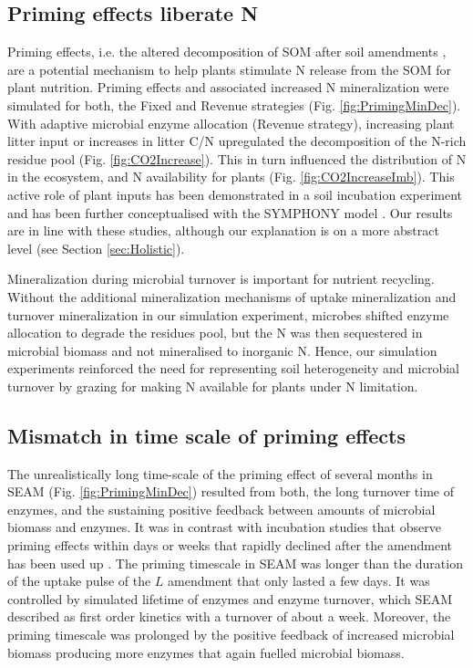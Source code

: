 \subsection{Priming effects liberate N}
Priming effects, i.e. the altered decomposition of SOM after soil amendments
\citep{Kuzyakov00}, are a potential mechanism to help plants stimulate N release
from the SOM for plant nutrition.
Priming effects and associated increased N mineralization were simulated for
both, the Fixed and Revenue strategies (Fig. \ref{fig:PrimingMinDec}). With
adaptive microbial enzyme allocation (Revenue strategy), increasing
plant litter input or increases in litter C/N upregulated
the decomposition of the N-rich residue pool (Fig.
\ref{fig:CO2Increase}).
This in turn influenced the distribution of N in the ecosystem, and N
availability for plants (Fig.
\ref{fig:CO2IncreaseImb}). This active role of plant inputs has been
demonstrated in a soil incubation experiment \citep{Fontaine11} and has been
further conceptualised with the SYMPHONY model \citep{Perveen14}. Our results
are in line with these studies, although our explanation is on a more abstract
level (see Section \ref{sec:Holistic}). 

Mineralization during microbial turnover is important for nutrient recycling.
Without the additional mineralization mechanisms of uptake mineralization
\citep{Manzoni08} and turnover mineralization \citep{Clarholm85, Raynaud06} in
our simulation experiment, microbes shifted enzyme allocation to degrade the
residues pool, but the N was then sequestered in microbial biomass and not
mineralised to inorganic N. Hence, our simulation experiments reinforced the
need for representing soil heterogeneity and microbial turnover by grazing
for making N available for plants under N limitation.

\subsection{Mismatch in time scale of priming effects}
The unrealistically long time-scale of the priming effect of several months in
SEAM (Fig. \ref{fig:PrimingMinDec}) resulted from both, the long turnover time of
enzymes, and the sustaining positive feedback between amounts of microbial
biomass and enzymes. It was in contrast with incubation studies that observe
priming effects within days or weeks that rapidly declined after the amendment
has been used up \citep{Blagodatskaya14}.
The priming timescale in SEAM was longer than the duration of the uptake pulse
of the $L$ amendment that only lasted a few days. It was controlled by simulated
lifetime of enzymes and enzyme turnover, which SEAM described as first order
kinetics with a turnover of about a week. Moreover, the priming timescale was
prolonged by the positive feedback of increased microbial biomass producing more
enzymes that again fuelled microbial biomass. 

